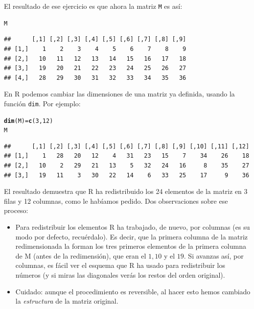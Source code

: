 \documentclass[10pt,a4paper]{article}\usepackage[]{graphicx}\usepackage[]{color}
\makeatletter
\newcommand{\hlnum}[1]{\textcolor[rgb]{0.686,0.059,0.569}{#1}}%
\newcommand{\hlstd}[1]{\textcolor[rgb]{0.345,0.345,0.345}{#1}}%
\newcommand{\hlkwb}[1]{\textcolor[rgb]{0.69,0.353,0.396}{#1}}%
\newcommand{\hlkwd}[1]{\textcolor[rgb]{0.737,0.353,0.396}{\textbf{#1}}}%
\newenvironment{kframe}{%
 \def\at@end@of@kframe{}%
 \ifinner\ifhmode%
  \def\at@end@of@kframe{\end{minipage}}%
  \begin{minipage}{\columnwidth}%
 \fi\fi%
 \def\FrameCommand##1{\hskip\@totalleftmargin \hskip-\fboxsep
 \colorbox{shadecolor}{##1}\hskip-\fboxsep
     \hskip-\linewidth \hskip-\@totalleftmargin \hskip\columnwidth}%
 \MakeFramed {\advance\hsize-\width
   \@totalleftmargin\z@ \linewidth\hsize
   \@setminipage}}%
 {\par\unskip\endMakeFramed%
 \at@end@of@kframe}
\newenvironment{knitrout}{}{} %
\makeatother
\begin{document}
El resultado de ese ejercicio es que ahora la matriz {\tt M} es así:
\begin{knitrout}
\color{fgcolor}\begin{kframe}
\begin{alltt}
\hlstd{M}
\end{alltt}
\begin{verbatim}
##      [,1] [,2] [,3] [,4] [,5] [,6] [,7] [,8] [,9]
## [1,]    1    2    3    4    5    6    7    8    9
## [2,]   10   11   12   13   14   15   16   17   18
## [3,]   19   20   21   22   23   24   25   26   27
## [4,]   28   29   30   31   32   33   34   35   36
\end{verbatim}
\end{kframe}
\end{knitrout}
En R podemos cambiar las dimensiones de una matriz ya definida, usando la función {\tt dim}. Por ejemplo:
\begin{knitrout}
\color{fgcolor}\begin{kframe}
\begin{alltt}
    \hlkwd{dim}\hlstd{(M)}\hlkwb{=}\hlkwd{c}\hlstd{(}\hlnum{3}\hlstd{,}\hlnum{12}\hlstd{)}
    \hlstd{M}
\end{alltt}
\begin{verbatim}
##      [,1] [,2] [,3] [,4] [,5] [,6] [,7] [,8] [,9] [,10] [,11] [,12]
## [1,]    1   28   20   12    4   31   23   15    7    34    26    18
## [2,]   10    2   29   21   13    5   32   24   16     8    35    27
## [3,]   19   11    3   30   22   14    6   33   25    17     9    36
\end{verbatim}
\end{kframe}
\end{knitrout}
El resultado demuestra que R ha redistribuido los 24 elementos de la matriz en 3 filas y 12 columnas, como le habíamos pedido. Dos observaciones sobre ese proceso:
\begin{itemize}
  \item Para redistribuir los elementos R ha trabajado, de nuevo, por columnas (es su modo por defecto, recuérdalo). Es decir, que la primera columna de la matriz redimensionada la forman los tres primeros elementos de la primera columna de M (antes de la redimensión), que eran el $1, 10$ y el $19$. Si avanzas así, por columnas, es fácil ver el esquema que R ha usado para redistribuir los números (y si miras las diagonales verás los restos del orden original).
  \item Cuidado: aunque el procedimiento es reversible, al hacer esto hemos cambiado la {\em estructura} de la matriz original.
\end{itemize}
\end{document}
